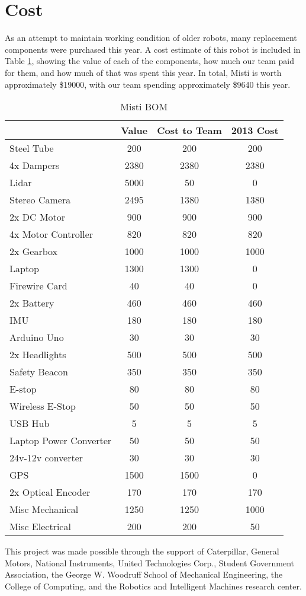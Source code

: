 \section{Cost}

As an attempt to maintain working condition of older robots, many replacement components were purchased this year. A cost estimate of this robot is included in Table \ref{TAB:Cost}, showing the value of each of the components, how much our team paid for them, and how much of that was spent this year. In total, Misti is worth approximately \$19000, with our team spending approximately \$9640 this year.

\begin{table}[H]
\begin{center}
\caption{Misti BOM}
\begin{tabular}{| l | c | c | c |}
\hline
& Value & Cost to Team & 2013 Cost\\ \hline
Steel Tube & 200 & 200 & 200\\ \hline
4x Dampers & 2380 & 2380 & 2380\\ \hline
Lidar & 5000 & 50 & 0\\ \hline
Stereo Camera & 2495 & 1380 & 1380\\ \hline
2x DC Motor & 900 & 900 & 900\\ \hline
4x Motor Controller & 820 & 820 & 820\\ \hline
2x Gearbox & 1000 & 1000 & 1000\\ \hline
Laptop & 1300 & 1300 & 0\\ \hline
Firewire Card & 40 & 40 & 0\\ \hline
2x Battery & 460 & 460 & 460\\ \hline
IMU & 180 & 180 & 180\\ \hline
Arduino Uno & 30 & 30 & 30\\ \hline
2x Headlights & 500 & 500 & 500\\ \hline
Safety Beacon & 350 & 350 & 350\\ \hline
E-stop & 80 & 80 & 80\\ \hline
Wireless E-Stop & 50 & 50 & 50\\ \hline
USB Hub & 5 & 5 & 5\\ \hline
Laptop Power Converter & 50 & 50 & 50\\ \hline
24v-12v converter & 30 & 30 & 30\\ \hline
GPS & 1500 & 1500 & 0\\ \hline
2x Optical Encoder & 170 & 170 & 170\\ \hline
Misc Mechanical & 1250 & 1250 & 1000\\ \hline
Misc Electrical & 200 & 200 & 50\\ \hline

\end{tabular}
\label{TAB:Cost}
\end{center}
\end{table}

This project was made possible through the support of Caterpillar, General Motors, National Instruments, United Technologies Corp., Student Government Association, the George W. Woodruff School of Mechanical Engineering, the College of Computing, and the Robotics and Intelligent Machines research center.

